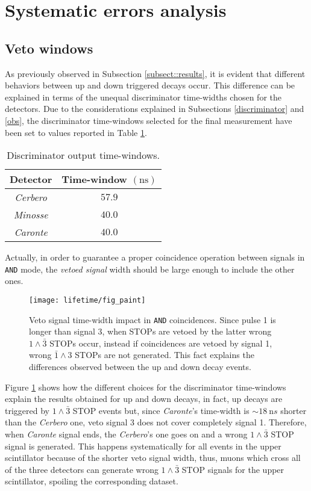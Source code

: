 \section{Systematic errors analysis}\label{sec:syst}

\subsection{Veto windows}
As previously observed in Subsection \ref{subsect::results}, it is evident that different behaviors between up and down triggered decays occur. This difference can be explained in terms of the unequal discriminator time-widths chosen for the detectors. Due to the considerations explained in Subsections \ref{discriminator} and \ref{obs}, the discriminator time-windows selected for the final measurement have been set to values reported in Table \ref{window_meas}.
\begin{table}[!htp]
	\centering
	\begin{tabular}{cc}
		\toprule
		Detector	&	Time-window $(\si{\nano\second})$ \\
		\midrule
		\emph{Cerbero}	&	$57.9$ \\		
		\emph{Minosse}	&	$40.0$ \\
		\emph{Caronte}	&	$40.0$ \\
		\bottomrule		
	\end{tabular}
	\caption{Discriminator output time-windows.}
	\label{window_meas}
\end{table}
Actually, in order to guarantee a proper coincidence operation between signals in \texttt{AND} mode, the \emph{vetoed signal} width should be large enough to include the other ones.
\begin{figure}[!htp]
	\centering
	\texttt{[image: lifetime/fig\_paint]}
	\caption{Veto signal time-width impact in \texttt{AND} coincidences. Since pulse 1 is longer than signal 3, when STOPs are vetoed by the latter wrong $1 \land \bar{3}$ STOPs occur, instead if coincidences are vetoed by signal 1, wrong $\bar{1} \land 3$ STOPs are not generated. This fact explains the differences observed between the up and down decay events.}
	\label{vetowindow}
\end{figure}
Figure \ref{vetowindow} shows how the different choices for the discriminator time-windows explain the results obtained for up and down decays, in fact, up decays are triggered by $1 \land \bar{3}$ STOP events but, since \emph{Caronte}'s time-width is $\sim \SI{18}{\nano s}$ shorter than the \emph{Cerbero} one, veto signal 3 does not cover completely signal 1. Therefore, when \emph{Caronte} signal ends, the \emph{Cerbero}'s one goes on and a wrong $1 \land \bar{3}$ STOP signal is generated. This happens systematically for all events in the upper scintillator because of the shorter veto signal width, thus, muons which cross all of the three detectors can generate wrong $1 \land \bar{3}$ STOP signals for the upper scintillator, spoiling the corresponding dataset.

